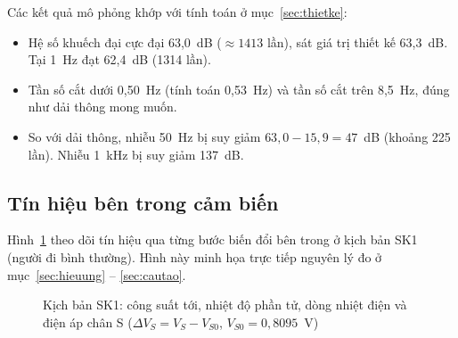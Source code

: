 Các kết quả mô phỏng khớp với tính toán ở mục~\ref{sec:thietke}:
\begin{itemize}
  \item Hệ số khuếch đại cực đại 63,0~dB ($\approx 1413$ lần), sát giá trị thiết kế 63,3~dB. Tại 1~Hz đạt 62,4~dB (1314 lần).
  \item Tần số cắt dưới 0,50~Hz (tính toán 0,53~Hz) và tần số cắt trên 8,5~Hz, đúng như dải thông mong muốn.
  \item So với dải thông, nhiễu 50~Hz bị suy giảm $63{,}0 - 15{,}9 = 47$~dB (khoảng 225 lần). Nhiễu 1~kHz bị suy giảm 137~dB.
\end{itemize}

\subsection{Tín hiệu bên trong cảm biến}
\label{sec:kq-cambien}

Hình~\ref{fig:sk1chain} theo dõi tín hiệu qua từng bước biến đổi bên trong \PYD{} ở kịch bản SK1 (người đi bình thường). Hình này minh họa trực tiếp nguyên lý đo ở mục~\ref{sec:hieuung} -- \ref{sec:cautao}.

\begin{figure}[!htb]
\centering
{}
\caption{Kịch bản SK1: công suất tới, nhiệt độ phần tử, dòng nhiệt điện và điện áp chân S ($\Delta V_S = V_S - V_{S0}$, $V_{S0} = 0{,}8095$~V)}
\label{fig:sk1chain}
\end{figure}

